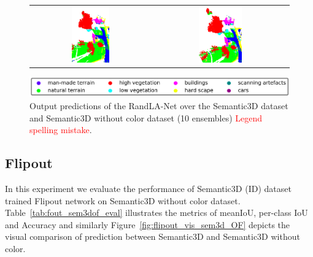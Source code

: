 \begin{figure}[h!]
\begin{tabular}{cc}
            \includegraphics[width=0.33\textwidth, height=0.18\textheight]{images/ood_imgs/de_sem3d/de_class_prob_3.pdf}&
            \includegraphics[width=0.33\textwidth, height=0.18\textheight]{images/sem3d_of/de_sem3d_of_3.pdf}\\
        \end{tabular}
        \includegraphics[scale=0.45]{images/legend.png}
        \caption{Output predictions of the RandLA-Net over the Semantic3D dataset and Semantic3D without color
         dataset  (10 ensembles) \textcolor{red}{Legend spelling mistake}.}
        \label{fig:deepensemble_vis_sem3d_OF}
    \end{figure}
    
    \FloatBarrier
    
    \subsection{Flipout}
    In this experiment we evaluate the performance of Semantic3D (ID) dataset trained Flipout network on Semantic3D without color dataset.
    Table~\ref{tab:fout_sem3dof_eval} illustrates the metrics of meanIoU, per-class IoU and Accuracy and similarly Figure~\ref{fig:flipout_vis_sem3d_OF} depicts the visual comparison of prediction between Semantic3D and Semantic3D without color.

